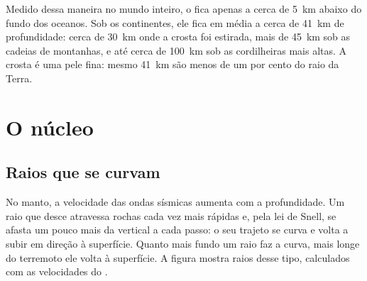 Medido dessa maneira no mundo inteiro, o  fica apenas a cerca de
\qty{5}{km} abaixo do fundo dos oceanos. Sob os continentes, ele fica em
média a cerca de \qty{41}{km} de profundidade: cerca de \qty{30}{km} onde a
crosta foi estirada, mais de \qty{45}{km} sob as cadeias de montanhas, e até
cerca de \qty{100}{km} sob as cordilheiras mais altas. A crosta é uma pele
fina: mesmo \qty{41}{km} são menos de um por cento do raio da Terra.

\section{O núcleo}

\subsection{Raios que se curvam}

No manto, a velocidade das ondas sísmicas aumenta com a profundidade. Um raio
que desce atravessa rochas cada vez mais rápidas e, pela lei de Snell, se
afasta um pouco mais da vertical a cada passo: o seu trajeto se curva e volta
a subir em direção à superfície. Quanto mais fundo um raio faz a curva, mais
longe do terremoto ele volta à superfície. A figura mostra raios desse tipo,
calculados com as velocidades do .


